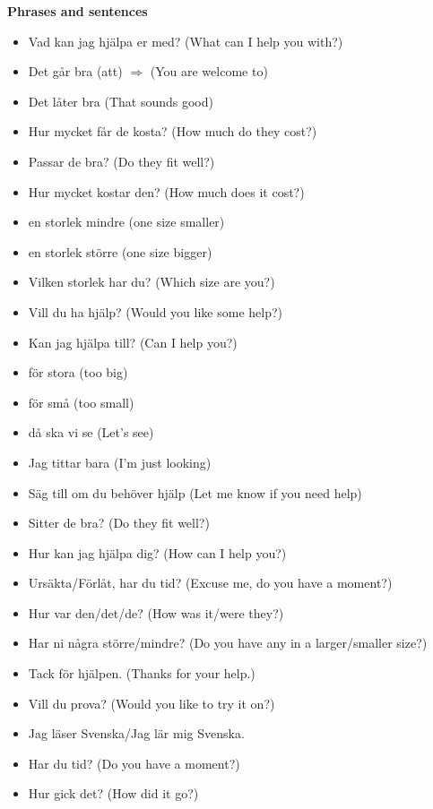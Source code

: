 
\begin{flushleft}
    \textbf{Phrases and sentences}
    \begin{itemize}
        \item Vad kan jag hjälpa er med? (What can I help you with?)
        \item Det går bra (att) $\Rightarrow$ (You are welcome to)
        \item Det låter bra (That sounds good)
        \item Hur mycket får de kosta? (How much do they cost?)
        \item Passar de bra? (Do they fit well?)
        \item Hur mycket kostar den? (How much does it cost?)
        \item en storlek mindre (one size smaller)
        \item en storlek större (one size bigger)
        \item Vilken storlek har du? (Which size are you?)
        \item Vill du ha hjälp? (Would you like some help?)
        \item Kan jag hjälpa till? (Can I help you?)
        \item för stora (too big)
        \item för små (too small)
        \item då ska vi se (Let's see)
        \item Jag tittar bara (I'm just looking)
        \item Säg till om du behöver hjälp (Let me know if you need help)
        \item Sitter de bra? (Do they fit well?)
        \item Hur kan jag hjälpa dig? (How can I help you?)
        \item Ursäkta/Förlåt, har du tid? (Excuse me, do you have a moment?)
        \item Hur var den/det/de? (How was it/were they?)
        \item Har ni några större/mindre? (Do you have any in a larger/smaller size?)
        \item Tack för hjälpen. (Thanks for your help.)
        \item Vill du prova? (Would you like to try it on?)
        \item Jag läser Svenska/Jag lär mig Svenska.
        \item Har du tid? (Do you have a moment?)
        \item Hur gick det? (How did it go?)
    \end{itemize}
\end{flushleft}

